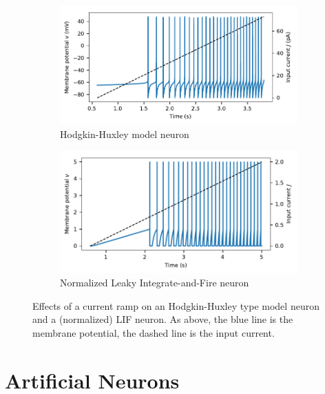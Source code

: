 \documentclass[10pt,letterpaper,oneside]{article}
\begin{document}
\begin{figure}[t]
	\begin{subfigure}{\textwidth}
		\centering
		\includegraphics{media/hh_neuron_ramp.pdf}
		\caption{Hodgkin-Huxley model neuron}
	\end{subfigure}
	\begin{subfigure}{\textwidth}
		\centering
		\includegraphics{media/lif_neuron_ramp.pdf}
		\caption{Normalized Leaky Integrate-and-Fire neuron}
	\end{subfigure}
	\caption{Effects of a current ramp on an Hodgkin-Huxley type model neuron and a (normalized) LIF neuron. As above, the blue line is the membrane potential, the dashed line is the input current.}
\end{figure}

\section{Artificial Neurons}

\end{document}
